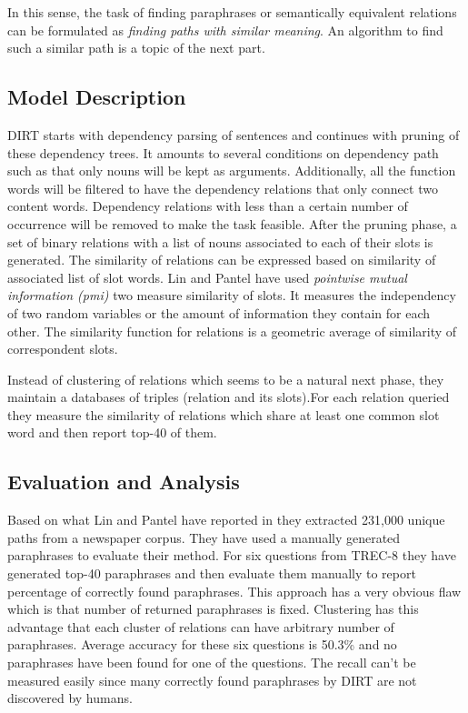 \documentclass[12pt]{report}
\begin{document}
      
    In this sense, the task of finding paraphrases or semantically equivalent relations
     can be formulated as \emph{finding paths with similar meaning}. 
     An algorithm to find such a similar path is a topic of the next part.

\subsection{Model Description}
\label{ch:dirt-model} 
DIRT starts with dependency parsing of sentences and continues with pruning of these dependency trees.
It amounts to several conditions on dependency path such as that only nouns will be kept as arguments. 
Additionally, all the function words will be filtered to have the dependency relations that only connect
two content words. Dependency relations with less than a certain number of occurrence will be removed to make the task feasible.
After the pruning phase, a set of binary relations with a list of nouns associated to each of their slots is generated. 
The similarity of relations can be expressed based on similarity of associated list of slot words. Lin and Pantel
have used \emph{pointwise mutual information (pmi)} two measure similarity of slots. 
It measures the independency of two random variables or the amount of
information they contain for each other. The similarity function for relations  is a geometric average
of similarity of correspondent slots.

Instead of clustering of relations which seems to be a natural next phase,
 they maintain a databases of triples (relation and its slots).For each relation queried
  they measure the similarity of relations which share at least one common slot word and then report top-40 of them.
  
\subsection{Evaluation and Analysis}
\label{ch:model} 
  
  Based on what Lin and Pantel have reported in \cite{Lin2001} they extracted 231,000 unique paths from a newspaper corpus.
  They have used a manually generated paraphrases to evaluate their method. For six questions from TREC-8 
  they have generated top-40 paraphrases and then evaluate them manually to report percentage of correctly found paraphrases.
  This approach has a very obvious flaw which is that number of returned paraphrases is fixed. Clustering has this 
  advantage that each cluster of relations can have arbitrary number of paraphrases.
  Average accuracy for these six questions is 50.3\% and no paraphrases have been found for one of the questions.
  The recall can't be measured easily since many correctly found paraphrases by DIRT are not discovered by humans.
  
\end{document}
